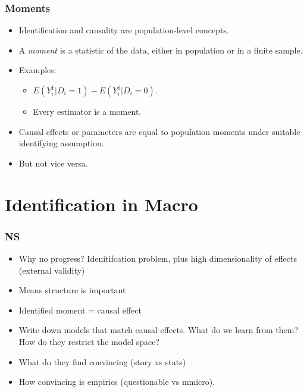 \documentclass[english,xcolor=svgnames]{beamer}
\begin{document}
\begin{frame}
\frametitle[alignment=center]{Moments}
\begin{itemize}
	\item Identification and causality are population-level concepts.
	\item A \emph{moment} is a statistic of the data, either in population or in a finite sample. 
	\item Examples:
	\begin{itemize}
		\item $E(Y_i^1 | D_i=1 ) - E(Y_i^0 | D_i=0 )$.
		\item Every estimator is a moment.
	\end{itemize}
	\item Causal effects or parameters are equal to population moments under suitable identifying assumption.
	\item But not vice versa.
\end{itemize}
\end{frame}



\section{Identification in Macro}


\begin{frame}
\frametitle[alignment=center]{NS}
\begin{itemize}
	\item Why no progress? Idenitifcation problem, plus high dimensionality of effects (external validity)
	\item Means structure is important
	\item Identified moment = causal effect
	\item Write down models that match causal effects. What do we learn from them? How do they restrict the model space?
	\item What do they find convincing (story vs stats)
	\item How convincing is empirics (questionable vs mmicro).
\end{itemize}
\end{frame}
\end{document}
